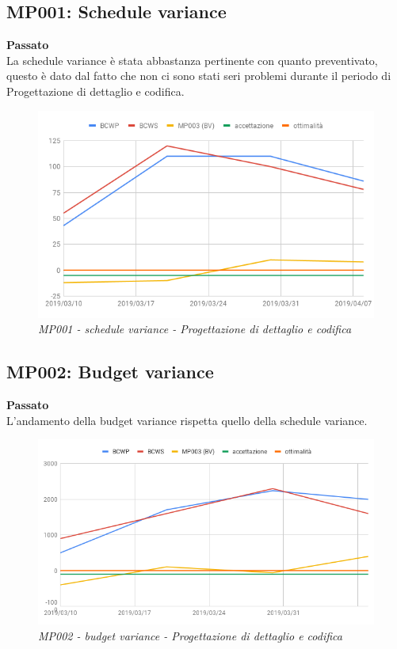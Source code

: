\subsection{MP001: Schedule variance}
\textbf{Passato}\\
La schedule variance è stata abbastanza pertinente con quanto preventivato, questo è dato dal fatto che non ci sono stati seri problemi durante il periodo di Progettazione di dettaglio e codifica.\\
\begin{figure} [H]
    \centering
	\includegraphics[scale=0.4]{./images/svPDC.png}
	\caption{\textit{MP001 - schedule variance - Progettazione di dettaglio e codifica}}\label{}
\end{figure}

\subsection{MP002: Budget variance}
\textbf{Passato}\\
L'andamento della budget variance rispetta quello della schedule variance.\\
\begin{figure} [H]
    \centering
	\includegraphics[scale=0.5]{./images/bvPDC.png}
	\caption{\textit{MP002 - budget variance - Progettazione di dettaglio e codifica}}\label{}
\end{figure}
